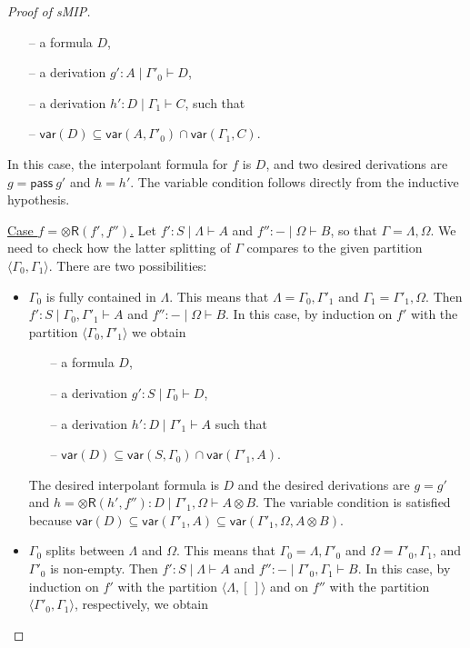 \documentclass[sn-mathphys-num]{sn-jnl}%
\newcommand{\GG}{\Gamma}
\newcommand{\GL}{\Lambda}
\newcommand{\GO}{\Omega}
\newcommand{\vd}{\vdash}
\newcommand{\tr}{\otimes\mathsf{R}}
\newcommand{\pass}{\mathsf{pass}}
\newcommand{\ot}{\otimes}
\newcommand{\mf}[1]{\mathsf{#1}}
\newcommand{\vars}[1]{\mf{var} (#1)}
\newcommand{\sMIP}{\textsf{sMIP}}
\theoremstyle{thmstyleone}%
\theoremstyle{thmstyletwo}%
\theoremstyle{thmstylethree}%
\begin{document}
\begin{proof}[Proof of \sMIP]
\begin{itemize}
\begin{itemize}
      \item[--] a formula $D$,
      \item[--] a derivation $g' : A \mid \GG'_0 \vd D$,
      \item[--] a derivation $h' : D \mid \GG_1 \vd C$, such that
      \item[--] $\vars{D} \subseteq \vars{A, \GG'_0} \cap \vars{\GG_1, C}$.
    \end{itemize}
    In this case, the interpolant formula for $f$ is $D$, and two desired derivations are $g = \pass \ g'$ and $h = h'$.
    The variable condition follows directly from the inductive hypothesis.
  \end{itemize} 
  \underline{Case $f = \tr (f',f'')$.} Let $f' : S \mid \GL \vd A$ and $f'' : {-} \mid \GO \vd B$, so that $\GG = \GL,\GO$. We need to check how the latter splitting of $\GG$ compares to the given partition $\langle \GG_0,\GG_1 \rangle$. 
  There are two possibilities:
  \begin{itemize}
    \item $\GG_0$ is fully contained in $\GL$. 
    This means that $\GL = \GG_0 , \GG'_1$ and $\GG_1 = \GG'_1,\GO$.
    Then $f' : S \mid \GG_0 , \GG'_1 \vd A$ and $f'' : {-} \mid \GO \vd B$.
    In this case, by induction on $f'$ with the partition $\langle \GG_0 , \GG'_1 \rangle$ we obtain
    \begin{itemize}
      \item[--] a formula $D$,
      \item[--] a derivation $g' : S \mid \GG_0 \vd D$, 
      \item[--] a derivation $h' : D \mid \GG'_1 \vd A$ such that 
      \item[--] $\vars{D} \subseteq \vars{S, \GG_0} \cap \vars{\GG'_1 , A}$.
    \end{itemize}
    The desired interpolant formula is $D$ and the desired derivations are $g = g'$ and $h = \tr (h' , f'') : D \mid \GG'_1 , \GO \vd A \ot B$.
    The variable condition is satisfied because $\vars{D} \subseteq \vars{\GG'_1 , A} \subseteq \vars{\GG'_1 , \GO , A \ot B}$.
    \item  $\GG_0$ splits between $\GL$ and $\GO$. 
    This means that $\GG_0 = \GL,\GG'_0$ and $\GO = \GG'_0,\GG_1$, and $\GG'_0$ is non-empty.
    Then $f' : S \mid \GL \vd A$ and $f'': {-} \mid \GG'_0, \GG_1 \vd B$.
    In this case, by induction on $f'$ with the partition $\langle \GL , [\ ] \rangle $ and on $f''$ with the partition $\langle \GG'_0 , \GG_1 \rangle$, respectively, we obtain
    \begin{itemize}

\end{itemize}
\end{itemize}
\end{proof}
\end{document}
